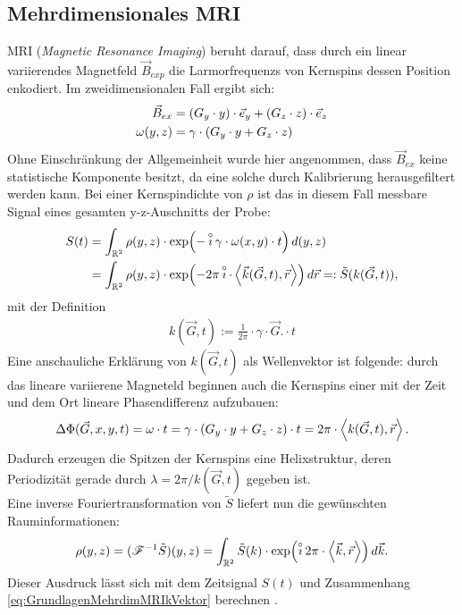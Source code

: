 \documentclass[../main.tex]{subfiles}
\begin{document}
\subsection{Mehrdimensionales MRI}
    MRI (\textit{Magnetic Resonance Imaging}) beruht darauf, dass durch ein linear variierendes Magnetfeld $\vec B_{exp}$ die Larmorfrequenzs von Kernspins dessen Position enkodiert. Im zweidimensionalen Fall ergibt sich:
    \begin{align*}
        \vec B_{ex} &= (G_y\cdot y)\cdot\vec e_y + (G_z\cdot z)\cdot\vec e_z\\
        \omega(y, z) &= \gamma\cdot\left(G_y\cdot y + G_z\cdot z\right)
    \end{align*}
    Ohne Einschränkung der Allgemeinheit wurde hier angenommen, dass $\vec B_{ex}$ keine statistische Komponente besitzt, da eine solche durch Kalibrierung herausgefiltert werden kann. Bei einer Kernspindichte von $\rho$ ist das in diesem Fall messbare Signal eines gesamten y-z-Auschnitts der Probe: 
    \begin{align*}
        S(t) &= \int_{\mathbb{R}^2} \rho(y,z)\cdot\exp(-\operatorname{\overset\circ\imath}\gamma\cdot\omega(x,y)\cdot t)\,d(y,z)\\
        &= \int_{\mathbb{R}^2}\rho(y,z)\cdot\exp(-2\pi\operatorname{\overset\circ\imath}\cdot\left\langle \vec{k}(\vec{G}, t),\vec{r}\right\rangle)\, d\vec{r} =: \tilde S(k(\vec{G}, t)),
    \end{align*}
    mit der Definition 
    \begin{align}
        k(\vec{G}, t):= \frac{1}{2\pi}\cdot \gamma\cdot\vec{G}.
        \label{eq:GrundlagenMehrdimMRIkVektor}\cdot t
    \end{align}
    Eine anschauliche Erklärung von $k(\vec{G}, t)$ als Wellenvektor ist folgende: durch das lineare variierene Magneteld beginnen auch die Kernspins einer mit der Zeit und dem Ort lineare Phasendifferenz aufzubauen:
    \[ 
        \Delta\Phi(\vec{G}, x,y,t) = \omega\cdot t = \gamma\cdot(G_y\cdot y + G_z\cdot z)\cdot t = 2\pi\cdot \left\langle k(\vec{G},t),\vec r\right\rangle.
    \]
    Dadurch erzeugen die Spitzen der Kernspins eine Helixstruktur, deren Periodizität gerade durch $\lambda = 2\pi/ k(\Vec{G},t)$ gegeben ist.\\

    Eine inverse Fouriertransformation von $\tilde S$ liefert nun die gewünschten Rauminformationen:
    \[
        \rho(y,z) = (\mathcal{F}^{-1}\tilde S)(y,z) = \int_{\mathbb{R}^2} \tilde S(k)\cdot\exp(\operatorname{\overset\circ\imath} 2\pi\cdot\left\langle \vec{k},\vec {r}\right\rangle)\,d\vec{k}.
    \]
    Dieser Ausdruck lässt sich mit dem Zeitsignal $S(t)$ und Zusammenhang \eqref{eq:GrundlagenMehrdimMRIkVektor} berechnen \cite[p.61-63]{doc:EFNMRStudentManual}.\\
\end{document}
